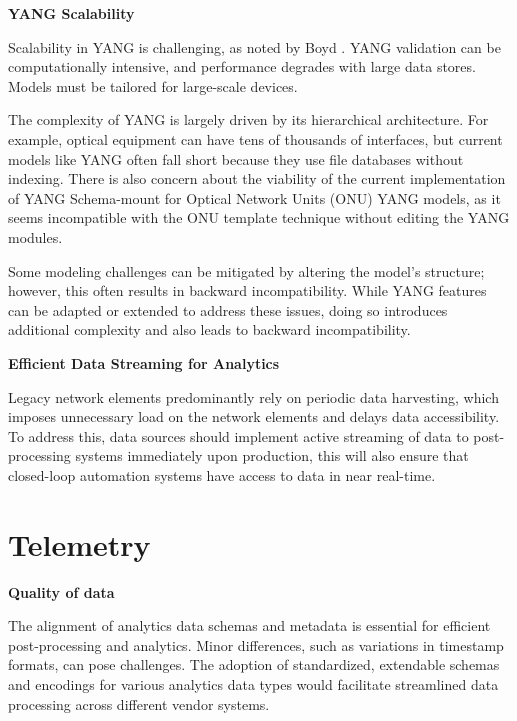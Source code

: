\documentclass[10pt,sigconf]{iabart}
\begin{document}
\textbf{YANG Scalability}

Scalability in YANG is challenging, as noted by Boyd \cite{boyd2023scalable}. YANG validation can be computationally intensive, and performance degrades with large data stores. Models must be tailored for large-scale devices.

The complexity of YANG is largely driven by its hierarchical architecture. For example, optical equipment can have tens of thousands of interfaces, but current models like YANG often fall short because they use file databases without indexing. There is also concern about the viability of the current implementation of YANG Schema-mount \cite{RFC8528} for Optical Network Units (ONU) YANG models, as it seems incompatible with the ONU template technique without editing the YANG modules.

Some modeling challenges can be mitigated by altering the model's structure; however, this often results in backward incompatibility. While YANG features can be adapted or extended to address these issues, doing so introduces additional complexity and also leads to backward incompatibility.

\textbf{Efficient Data Streaming for Analytics}

Legacy network elements predominantly rely on periodic data harvesting, which imposes unnecessary load on the network elements and delays data accessibility. To address this, data sources should implement active streaming of data to post-processing systems immediately upon production, this will also ensure that closed-loop automation systems have access to data in near real-time.

\section{Telemetry} \label{telemetry}




\textbf{Quality of data} 

The alignment of analytics data schemas and metadata is essential for efficient post-processing and analytics. Minor differences, such as variations in timestamp formats, can pose challenges. The adoption of standardized, extendable schemas and encodings for various analytics data types would facilitate streamlined data processing across different vendor systems.
\end{document}

